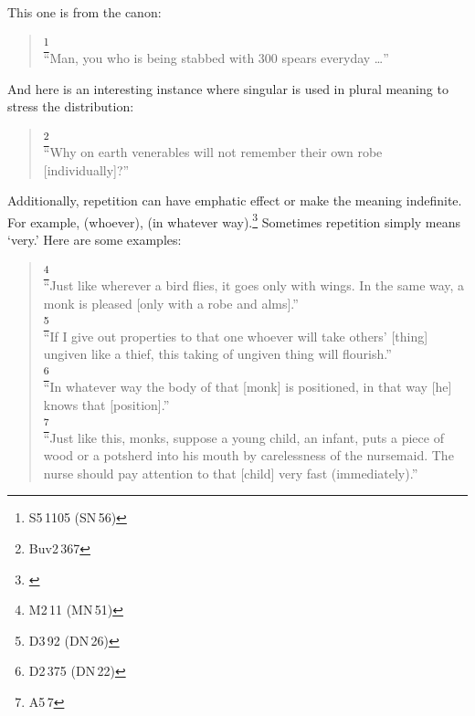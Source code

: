 \bigskip
This one is from the canon:\par
\begin{quote}
\footnote{S5\,1105 (SN\,56)}\\
``Man, you who is being stabbed with 300 spears everyday \ldots''
\end{quote}

And here is an interesting instance where singular  is used in plural meaning to stress the distribution:

\begin{quote}
\footnote{Buv2\,367}\\
``Why on earth venerables will not remember their own robe [individually]?''
\end{quote}

\bigskip
Additionally, repetition can have emphatic effect or make the meaning indefinite. For example,  (whoever),  (in whatever way).\footnote{\citealp[p.~72, 171]{warder:intro}} Sometimes repetition simply means `very.' Here are some examples:

\begin{quote}
\footnote{M2\,11 (MN\,51)}\\
``Just like wherever a bird flies, it goes only with wings. In the same way, a monk is pleased [only with a robe and alms].''\\[1.5mm]
\footnote{D3\,92 (DN\,26)}\\
``If I give out properties to that one whoever will take others' [thing] ungiven like a thief, this taking of ungiven thing will flourish.''\\[1.5mm]
\footnote{D2\,375 (DN\,22)}\\
``In whatever way the body of that [monk] is positioned, in that way [he] knows that [position].''\\[1.5mm]
\footnote{A5\,7}\\
``Just like this, monks, suppose a young child, an infant, puts a piece of wood or a potsherd into his mouth by carelessness of the nursemaid. The nurse should pay attention to that [child] very fast (immediately).''\\[1.5mm]
\end{quote}

